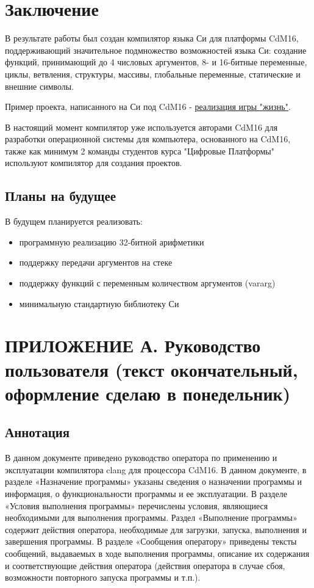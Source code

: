 \documentclass[a4paper,14pt]{extarticle}
\begin{document}
\clearpage %
\section{Заключение}

В результате работы был создан компилятор языка Си для платформы CdM16, поддерживающий значительное подмножество возможностей языка Си: создание функций, принимающий до 4 числовых аргументов, 8- и 16-битные переменные, циклы, ветвления, структуры, массивы, глобальные переменные, статические и внешние символы.

Пример проекта, написанного на Си под CdM16 - \href{https://github.com/leadpogrommer/llvm-project-cdm/tree/backend/cdm/llvm/test_cdm/life_multifile}{реализация игры "жизнь"}.

В настоящий момент компилятор уже используется авторами CdM16 для разработки операционной системы для компьютера, основанного на CdM16\cite{cdm:coconut}, также как минимум 2 команды студентов курса "Цифровые Платформы" используют компилятор для создания проектов.

\subsection{Планы на будущее}

В будущем планируется реализовать:
\begin{itemize}
	\item программную реализацию 32-битной арифметики
	\item поддержку передачи аргументов на стеке
	\item поддержку функций с переменным количеством аргументов (vararg)
	\item минимальную стандартную библиотеку Си
\end{itemize}


\pagebreak
\printbibliography
{}


\pagebreak
\section{ПРИЛОЖЕНИЕ А. Руководство пользователя (текст окончательный, оформление сделаю в понедельник)}
\subsection{Аннотация}
В данном документе приведено руководство оператора по применению и эксплуатации компилятора clang для процессора CdM16. В данном документе, в разделе «Назначение программы» указаны сведения о назначении программы и информация, о функциональности программы и ее эксплуатации. В разделе «Условия выполнения программы» перечислены условия, являющиеся необходимыми для выполнения программы. Раздел «Выполнение программы» содержит действия оператора, необходимые для загрузки, запуска, выполнения и завершения программы. В разделе «Сообщения оператору» приведены тексты сообщений, выдаваемых в ходе выполнения программы, описание их содержания и соответствующие действия оператора (действия оператора в случае сбоя, возможности повторного запуска программы и т.п.).
\end{document}
